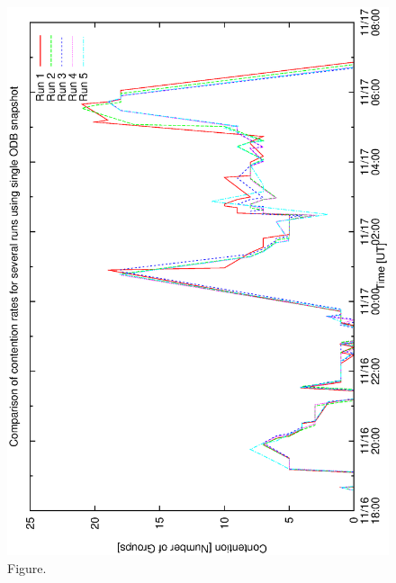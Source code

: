 \documentclass[12pt,a4paper]{article}
\begin{document}
\begin{figure}[htbp]
 \begin{center}
  \includegraphics[scale=1.0, angle=0]{figures/bs1_pr.eps}
 \end{center}
  \caption[Figure.]
{Figure.}
\end{figure}
\clearpage
\end{document}
